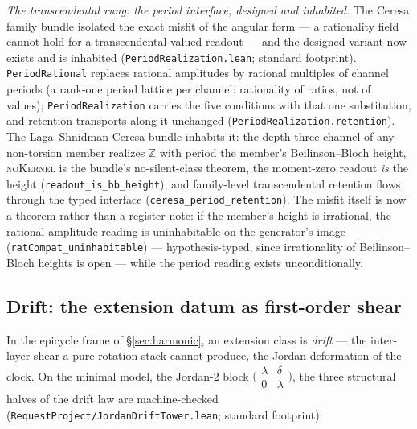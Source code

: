 \documentclass[11pt]{article}
\theoremstyle{definition}
\theoremstyle{remark}
\begin{document}
\emph{The transcendental rung: the period interface, designed and
inhabited.}  The Ceresa family bundle isolated the exact misfit of the
angular form --- a rationality field cannot hold for a
transcendental-valued readout --- and the designed variant now exists and
is inhabited (\texttt{PeriodRealization.lean}; standard footprint).
\texttt{PeriodRational} replaces rational amplitudes by rational
multiples of channel periods (a rank-one period lattice per channel:
rationality of ratios, not of values); \texttt{PeriodRealization} carries
the five conditions with that one substitution, and retention transports
along it unchanged (\texttt{PeriodRealization.retention}).  The
Laga--Shnidman Ceresa bundle inhabits it: the depth-three channel of any
non-torsion member realizes $\mathbb Z$ with period the member's
Beilinson--Bloch height, \textsc{noKernel} is the bundle's
no-silent-class theorem, the moment-zero readout \emph{is} the height
(\texttt{readout\_is\_bb\_height}), and family-level transcendental
retention flows through the typed interface
(\texttt{ceresa\_period\_retention}).  The misfit itself is now a
theorem rather than a register note: if the member's height is
irrational, the rational-amplitude reading is uninhabitable on the
generator's image (\texttt{ratCompat\_uninhabitable}) ---
hypothesis-typed, since irrationality of Beilinson--Bloch heights is
open --- while the period reading exists unconditionally.

\subsection{Drift: the extension datum as first-order shear}\label{sec:drift}

In the epicycle frame of \S\ref{sec:harmonic}, an extension class is
\emph{drift} --- the inter-layer shear a pure rotation stack cannot produce,
the Jordan deformation of the clock. On the minimal model, the Jordan-2 block
$\bigl(\begin{smallmatrix}\lambda&\delta\\0&\lambda\end{smallmatrix}\bigr)$,
the three structural halves of the drift law are machine-checked
(\texttt{RequestProject/JordanDriftTower.lean}; standard footprint):
\end{document}
